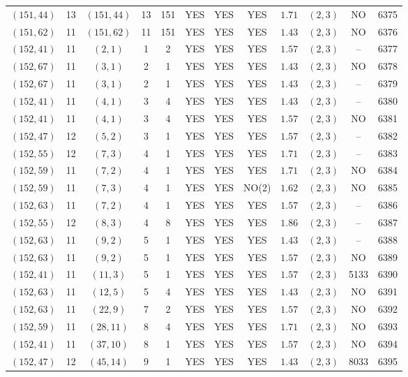\begin{longtable}{|c|c|c|c|c|c|c|c|c|c|c|c|}
$(151,44)$ & 13 & $(151,44)$ & 13 & 151 & YES & YES & YES & $1.71$ & $(2,3)$ & NO & 6375\\
$(151,62)$ & 11 & $(151,62)$ & 11 & 151 & YES & YES & YES & $1.43$ & $(2,3)$ & NO & 6376\\
$(152,41)$ & 11 & $(2,1)$ & 1 & 2 & YES & YES & YES & $1.57$ & $(2,3)$ & -- & 6377\\
$(152,67)$ & 11 & $(3,1)$ & 2 & 1 & YES & YES & YES & $1.43$ & $(2,3)$ & NO & 6378\\
$(152,67)$ & 11 & $(3,1)$ & 2 & 1 & YES & YES & YES & $1.43$ & $(2,3)$ & -- & 6379\\
$(152,41)$ & 11 & $(4,1)$ & 3 & 4 & YES & YES & YES & $1.43$ & $(2,3)$ & -- & 6380\\
$(152,41)$ & 11 & $(4,1)$ & 3 & 4 & YES & YES & YES & $1.57$ & $(2,3)$ & NO & 6381\\
$(152,47)$ & 12 & $(5,2)$ & 3 & 1 & YES & YES & YES & $1.57$ & $(2,3)$ & -- & 6382\\
$(152,55)$ & 12 & $(7,3)$ & 4 & 1 & YES & YES & YES & $1.71$ & $(2,3)$ & -- & 6383\\
$(152,59)$ & 11 & $(7,2)$ & 4 & 1 & YES & YES & YES & $1.71$ & $(2,3)$ & NO & 6384\\
$(152,59)$ & 11 & $(7,3)$ & 4 & 1 & YES & YES & NO(2) & $1.62$ & $(2,3)$ & NO & 6385\\
$(152,63)$ & 11 & $(7,2)$ & 4 & 1 & YES & YES & YES & $1.57$ & $(2,3)$ & -- & 6386\\
$(152,55)$ & 12 & $(8,3)$ & 4 & 8 & YES & YES & YES & $1.86$ & $(2,3)$ & -- & 6387\\
$(152,63)$ & 11 & $(9,2)$ & 5 & 1 & YES & YES & YES & $1.43$ & $(2,3)$ & -- & 6388\\
$(152,63)$ & 11 & $(9,2)$ & 5 & 1 & YES & YES & YES & $1.57$ & $(2,3)$ & NO & 6389\\
$(152,41)$ & 11 & $(11,3)$ & 5 & 1 & YES & YES & YES & $1.57$ & $(2,3)$ & 5133 & 6390\\
$(152,63)$ & 11 & $(12,5)$ & 5 & 4 & YES & YES & YES & $1.43$ & $(2,3)$ & NO & 6391\\
$(152,63)$ & 11 & $(22,9)$ & 7 & 2 & YES & YES & YES & $1.57$ & $(2,3)$ & NO & 6392\\
$(152,59)$ & 11 & $(28,11)$ & 8 & 4 & YES & YES & YES & $1.71$ & $(2,3)$ & NO & 6393\\
$(152,41)$ & 11 & $(37,10)$ & 8 & 1 & YES & YES & YES & $1.57$ & $(2,3)$ & NO & 6394\\
$(152,47)$ & 12 & $(45,14)$ & 9 & 1 & YES & YES & YES & $1.43$ & $(2,3)$ & 8033 & 6395\\

\end{longtable}
